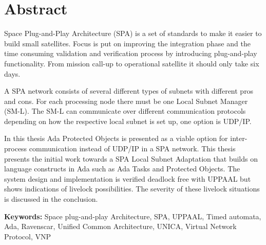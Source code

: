 \chapter*{Abstract}
\thispagestyle{empty} %
Space Plug-and-Play Architecture (SPA) is a set of standards to make it easier
to build small satellites. Focus is put on improving the integration phase and
the time consuming validation and verification process by introducing
plug-and-play functionality. From mission call-up to operational satellite it
should only take six days.

A SPA network consists of several different types of subnets with different
pros and cons. For each processing node there must be one Local Subnet Manager
(SM-L). The SM-L can communicate over different communication protocols
depending on how the respective local subnet is set up, one option is UDP/IP.

In this thesis Ada Protected Objects is presented as a viable option for
inter-process communication instead of UDP/IP in a SPA network. This thesis
presents the initial work towards a SPA Local Subnet Adaptation that builds on
language constructs in Ada such as Ada Tasks and Protected Objects.  The system
design and implementation is verified deadlock free with UPPAAL but shows
indications of livelock possibilities. The severity of these livelock
situations is discussed in the conclusion.

\textbf{Keywords:} Space plug-and-play Architecture, SPA, UPPAAL, Timed
automata, Ada, Ravenscar, Unified Common Architecture, UNICA, Virtual Network
Protocol, VNP
